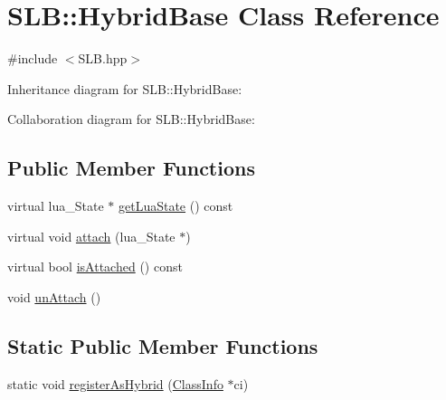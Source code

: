 \hypertarget{classSLB_1_1HybridBase}{}\section{S\+LB\+:\+:Hybrid\+Base Class Reference}
\label{classSLB_1_1HybridBase}


{\ttfamily \#include $<$S\+L\+B.\+hpp$>$}



Inheritance diagram for S\+LB\+:\+:Hybrid\+Base\+:


Collaboration diagram for S\+LB\+:\+:Hybrid\+Base\+:
\subsection*{Public Member Functions}
\begin{DoxyCompactItemize}
\item 
virtual lua\+\_\+\+State $\ast$ \hyperlink{classSLB_1_1HybridBase_adec9d4333cdd875f60666ef592685ad9}{get\+Lua\+State} () const 
\item 
virtual void \hyperlink{classSLB_1_1HybridBase_aae78e1a31c9417a2af355de11d7ac145}{attach} (lua\+\_\+\+State $\ast$)
\item 
virtual bool \hyperlink{classSLB_1_1HybridBase_adc23d6cdac6debf7a5981fef426c69d2}{is\+Attached} () const 
\item 
void \hyperlink{classSLB_1_1HybridBase_a7992f9a56badf6373cc9e32eec63cbc9}{un\+Attach} ()
\end{DoxyCompactItemize}
\subsection*{Static Public Member Functions}
\begin{DoxyCompactItemize}
\item 
static void \hyperlink{classSLB_1_1HybridBase_ad41d04e125bfbd1bbc0f685f45ff7671}{register\+As\+Hybrid} (\hyperlink{classSLB_1_1ClassInfo}{Class\+Info} $\ast$ci)
\end{DoxyCompactItemize}
